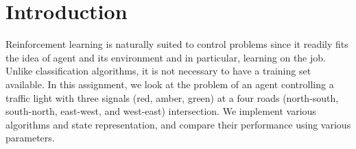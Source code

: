 \section {Introduction}

Reinforcement learning is naturally suited to control problems
since it readily fits the idea of agent and its environment and
in particular, learning on the job. Unlike classification algorithms,
it is not necessary to have a training set available. In this assignment,
we look at the problem of an agent controlling a traffic light with
three signals (red, amber, green) at a four roads (north-south,
south-north, east-west, and west-east) intersection. We implement various algorithms
and state representation, and compare their performance using
various parameters.



